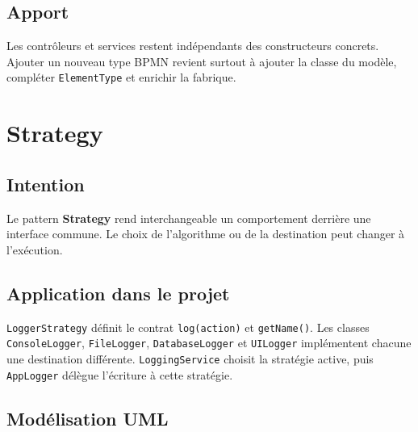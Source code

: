 \documentclass[12pt,a4paper]{article}
\newenvironment{umlfigure}
{\begin{center}\resizebox{0.90\textwidth}{!}\bgroup}
{\egroup\end{center}}
\begin{document}
\begin{umlfigure}
\end{umlfigure}

\subsection{Apport}

Les contrôleurs et services restent indépendants des constructeurs concrets. Ajouter un nouveau type BPMN revient surtout à ajouter la classe du modèle, compléter \texttt{ElementType} et enrichir la fabrique.

\section{Strategy}

\subsection{Intention}

Le pattern \textbf{Strategy} rend interchangeable un comportement derrière une interface commune. Le choix de l'algorithme ou de la destination peut changer à l'exécution.

\subsection{Application dans le projet}

\texttt{LoggerStrategy} définit le contrat \texttt{log(action)} et \texttt{getName()}. Les classes \texttt{ConsoleLogger}, \texttt{FileLogger}, \texttt{DatabaseLogger} et \texttt{UILogger} implémentent chacune une destination différente. \texttt{LoggingService} choisit la stratégie active, puis \texttt{AppLogger} délègue l'écriture à cette stratégie.

\subsection{Modélisation UML}
\end{document}
